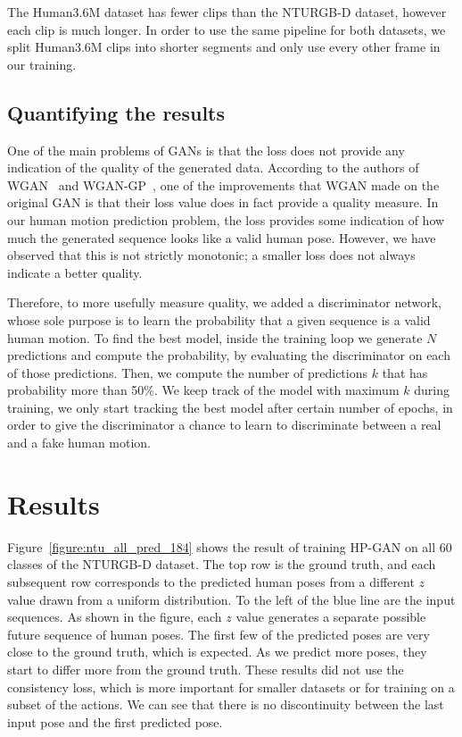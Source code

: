 \documentclass[10pt,twocolumn,letterpaper]{article}
\begin{document}
The Human3.6M dataset has fewer clips than the NTURGB-D dataset, however each clip is much longer. In order to use the same pipeline for both datasets, we split Human3.6M clips into shorter segments and only use every other frame in our training.

\subsection{Quantifying the results}

One of the main problems of GANs is that the loss does not provide any indication of the quality of the generated data. According to the authors of WGAN~\cite{corr2017:Arjovsky} and WGAN-GP~\cite{corr2017:Ishaan}, one of the improvements that WGAN made on the original GAN is that their loss value does in fact provide a quality measure. In our human motion prediction problem, the loss provides some indication of how much the generated sequence looks like a valid human pose. However, we have observed that this is not strictly monotonic; a smaller loss does not always indicate a better quality.

Therefore, to more usefully measure quality, we added a discriminator network, whose sole purpose is to learn the probability that a given sequence is a valid human motion. To find the best model, inside the training loop we generate $N$ predictions and compute the probability, by evaluating the discriminator on each of those predictions. Then, we compute the number of predictions $k$ that has probability more than 50\%. We keep track of the model with maximum $k$ during training, we only start tracking the best model after certain number of epochs, in order to give the discriminator a chance to learn to discriminate between a real and a fake human motion.  

\section{Results}
Figure~\ref{figure:ntu_all_pred_184} shows the result of training HP-GAN on all 60 classes of the NTURGB-D dataset. The top row is the ground truth, and each subsequent row corresponds to the predicted human poses from a different $z$ value drawn from a uniform distribution. To the left of the blue line are the input sequences. As shown in the figure, each $z$ value generates a separate possible future sequence of human poses. The first few of the predicted poses are very close to the ground truth, which is expected. As we predict more poses, they start to differ more from the ground truth. These results did not use the consistency loss, which is more important for smaller datasets or for training on a subset of the actions. We can see that there is no discontinuity between the last input pose and the first predicted pose. 
\end{document}
